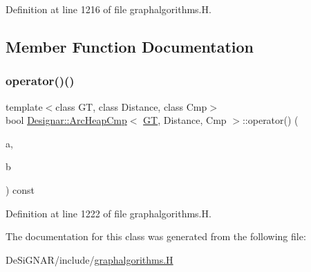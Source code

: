 Definition at line 1216 of file graphalgorithms.\+H.



\subsection{Member Function Documentation}
\mbox{\label{class_designar_1_1_arc_heap_cmp_a9d86fd876bad098a0a6844e9b302f141}} 
\subsubsection{\texorpdfstring{operator()()}{operator()()}}
{\footnotesize\ttfamily template$<$class GT, class Distance, class Cmp$>$ \\
bool \hyperlink{class_designar_1_1_arc_heap_cmp}{Designar\+::\+Arc\+Heap\+Cmp}$<$ \hyperlink{demo-buildgraph_8_c_a3001c40d2c31ca87ed96cd7d1334a55e}{GT}, Distance, Cmp $>$\+::operator() (\begin{DoxyParamCaption}\item[{typename G\+T\+::\+Arc $\ast$}]{a,  }\item[{typename G\+T\+::\+Arc $\ast$}]{b }\end{DoxyParamCaption}) const\hspace{0.3cm}{\ttfamily [inline]}}



Definition at line 1222 of file graphalgorithms.\+H.



The documentation for this class was generated from the following file\+:\begin{DoxyCompactItemize}
\item 
De\+Si\+G\+N\+A\+R/include/\hyperlink{graphalgorithms_8_h}{graphalgorithms.\+H}\end{DoxyCompactItemize}
